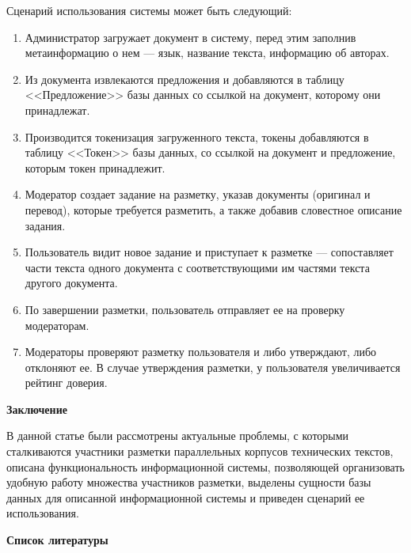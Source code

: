 \documentclass[a4paper,oneside,14pt]{article}
\begin{document}
Сценарий использования системы может быть следующий:
\begin{enumerate}
    \item Администратор загружает документ в систему, перед этим заполнив метаинформацию о нем --- язык, название текста, информацию об авторах.
    \item Из документа извлекаются предложения и добавляются в таблицу <<Предложение>> базы данных со ссылкой на документ, которому они принадлежат.
    \item Производится токенизация загруженного текста, токены добавляются в таблицу <<Токен>> базы данных, со ссылкой на документ и предложение, которым токен принадлежит.
    \item Модератор создает задание на разметку, указав документы (оригинал и перевод), которые требуется разметить, а также добавив словестное описание задания.
    \item Пользователь видит новое задание и приступает к разметке --- сопоставляет части текста одного документа с соответствующими им частями текста другого документа.
    \item По завершении разметки, пользователь отправляет ее на проверку модераторам.
    \item Модераторы проверяют разметку пользователя и либо утверждают, либо отклоняют ее. В случае утверждения разметки, у пользователя увеличивается рейтинг доверия.
\end{enumerate}


\textbf{Заключение}

В данной статье были рассмотрены актуальные проблемы, с которыми сталкиваются участники разметки параллельных корпусов технических текстов, описана функциональность информационной системы, позволяющей организовать удобную работу множества участников разметки, выделены сущности базы данных для описанной информационной системы и приведен сценарий ее использования.

\noindent
\textbf{Список литературы}

\begingroup
\renewcommand{\section}[2]{}

\endgroup

% 
% 

\end{document}
